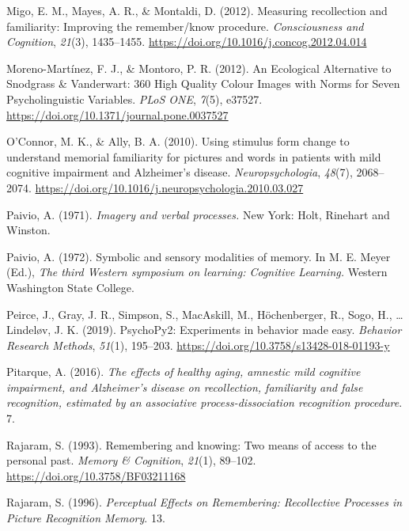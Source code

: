 \documentclass[
  11pt,
]{article}
\begin{document}
\leavevmode\hypertarget{ref-migo2012}{}%
Migo, E. M., Mayes, A. R., \& Montaldi, D. (2012). Measuring
recollection and familiarity: Improving the remember/know procedure.
\emph{Consciousness and Cognition}, \emph{21}(3), 1435--1455.
\url{https://doi.org/10.1016/j.concog.2012.04.014}

\leavevmode\hypertarget{ref-moreno-martinez2012}{}%
Moreno-Martínez, F. J., \& Montoro, P. R. (2012). An Ecological
Alternative to Snodgrass \& Vanderwart: 360 High Quality Colour Images
with Norms for Seven Psycholinguistic Variables. \emph{PLoS ONE},
\emph{7}(5), e37527. \url{https://doi.org/10.1371/journal.pone.0037527}

\leavevmode\hypertarget{ref-oconnor2010}{}%
O'Connor, M. K., \& Ally, B. A. (2010). Using stimulus form change to
understand memorial familiarity for pictures and words in patients with
mild cognitive impairment and Alzheimer's disease.
\emph{Neuropsychologia}, \emph{48}(7), 2068--2074.
\url{https://doi.org/10.1016/j.neuropsychologia.2010.03.027}

\leavevmode\hypertarget{ref-paivio1971}{}%
Paivio, A. (1971). \emph{Imagery and verbal processes.} New York: Holt,
Rinehart and Winston.

\leavevmode\hypertarget{ref-paivio1972}{}%
Paivio, A. (1972). Symbolic and sensory modalities of memory. In M. E.
Meyer (Ed.), \emph{The third Western symposium on learning: Cognitive
Learning.} Western Washington State College.

\leavevmode\hypertarget{ref-peirce2019}{}%
Peirce, J., Gray, J. R., Simpson, S., MacAskill, M., Höchenberger, R.,
Sogo, H., \ldots{} Lindeløv, J. K. (2019). PsychoPy2: Experiments in
behavior made easy. \emph{Behavior Research Methods}, \emph{51}(1),
195--203. \url{https://doi.org/10.3758/s13428-018-01193-y}

\leavevmode\hypertarget{ref-pitarque2016}{}%
Pitarque, A. (2016). \emph{The effects of healthy aging, amnestic mild
cognitive impairment, and Alzheimer's disease on recollection,
familiarity and false recognition, estimated by an associative
process-dissociation recognition procedure}. 7.

\leavevmode\hypertarget{ref-rajaram1993}{}%
Rajaram, S. (1993). Remembering and knowing: Two means of access to the
personal past. \emph{Memory \& Cognition}, \emph{21}(1), 89--102.
\url{https://doi.org/10.3758/BF03211168}

\leavevmode\hypertarget{ref-rajaram1996}{}%
Rajaram, S. (1996). \emph{Perceptual Effects on Remembering:
Recollective Processes in Picture Recognition Memory}. 13.
\end{document}
